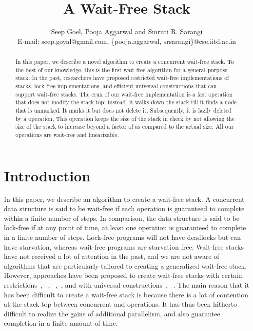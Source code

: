 \documentclass{llncs}
\title{A Wait-Free Stack}
\author{Seep Goel, Pooja Aggarwal and Smruti R. Sarangi \\
E-mail: seep.goyal@gmail.com, \{pooja.aggarwal, srsarangi\}@cse.iitd.ac.in
\institute{Indian Institute of Technology, New Delhi, India} }
\begin{document}
\maketitle
\begin{abstract}
In this paper, we describe a novel algorithm to create a concurrent wait-free stack. To the best
of our knowledge, this is the first wait-free algorithm for a general purpose stack. In the past,
researchers have proposed restricted wait-free implementations of stacks, lock-free implementations,
and efficient universal constructions that can support wait-free stacks. The crux of our
wait-free implementation is a fast  operation that does not modify the stack top; instead,
it walks down the stack till it finds a node that is unmarked. It marks it but does not delete it.
Subsequently, it is lazily deleted by a  operation. 
This operation keeps the size of the stack in check by not allowing the size of the stack to 
increase beyond a factor of  as compared to 
the actual size. All our operations are wait-free and linearizable.
\end{abstract}
\section{Introduction}
\label{sec:intro}
In this paper, we describe an algorithm to create a wait-free stack. A concurrent data structure is said to be
wait-free if each operation is guaranteed to complete within a finite number of steps. In comparison, the data
structure is said to be lock-free if at any point of time, at least one operation is guaranteed to complete
in a finite number of steps. Lock-free programs will not have deadlocks but can have starvation, whereas
wait-free programs are starvation free. Wait-free stacks have not received
a lot of attention in the past, and we are not aware of algorithms that are particularly tailored to creating
a generalized wait-free stack. However, approaches have been proposed to create wait-free stacks with certain
restrictions~\cite{arrayBased}, ~\cite{restrictedStack}, ~\cite{WaitFreeSharedCounter1},~\cite{WaitFreeSharedCounter2}, 
and with universal constructions~\cite{oldUniversal}, ~\cite{newUniversal}. The main reason that it has been 
difficult to create a wait-free stack is because there
is a lot of contention at the stack top between concurrent  and  operations. It has thus been
hitherto difficult to realize the gains of additional parallelism, and also guarantee completion in a finite
amount of time.
\end{document}
